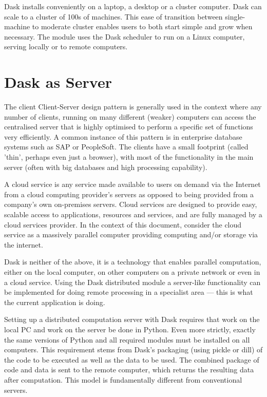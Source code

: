 Dask installs  conveniently  on a laptop, a desktop or a cluster computer. Dask can scale to a cluster of 100s of machines. This ease of transition between single-machine to moderate cluster enables users to both start simple and grow when necessary.  The \libradtrandask{} module uses the Dask scheduler to run \libradtran{} on a Linux computer, serving locally or to remote computers.

\section{Dask as Server}

The client Client-Server design pattern is generally used in the context where any number of clients, running on many different (weaker) computers can access the centralised server that is highly optimised to perform a specific set of functions very efficiently.  A common instance of this pattern is in enterprise database systems such as SAP or PeopleSoft. The clients have a small footprint (called 'thin', perhaps even just a browser), with most of the functionality in the main server (often with big databases and high processing capability).

A cloud service is any service made available to users on demand via the Internet from a cloud computing provider's servers as opposed to being provided from a company's own on-premises servers. Cloud services are designed to provide easy, scalable access to applications, resources and services, and are fully managed by a cloud services provider.
In the context of this document, consider the cloud service as a massively parallel computer providing computing and/or storage via the internet.

Dask is neither of the above, it is a technology that enables parallel computation, either on the local computer, on other computers on a private network or even in a cloud service.
Using the Dask distributed module a server-like functionality can be implemented  for doing remote processing in a specialist area --- this is what the current application is doing.

Setting up a distributed computation server with Dask requires that work on the local PC and work on the server be done in Python. Even more strictly, exactly the same versions of Python and all required modules must be installed on all computers.  This requirement stems from Dask's packaging (using pickle or dill) of the code to be executed as well as the data to be used. The combined package of code and data is sent to the remote computer, which returns the resulting data after computation. This model is fundamentally different from conventional servers.

